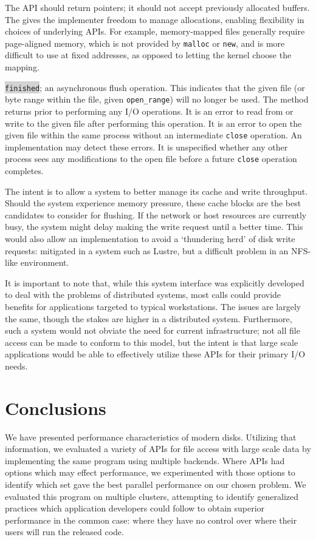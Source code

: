 The API should return pointers; it should not accept previously
allocated buffers.  The gives the implementer freedom to manage
allocations, enabling flexibility in choices of underlying APIs.  For
example, memory-mapped files generally require page-aligned memory,
which is not provided by \verb!malloc! or \verb!new!, and is more
difficult to use at fixed addresses, as opposed to letting the kernel
choose the mapping.

\colorbox{lightgray}{\texttt{finished}}; an asynchronous flush
operation.  This indicates that the given file (or byte range within
the file, given \texttt{open\_range}) will no longer be used.  The
method returns prior to performing any I/O operations.  It is an
error to read from or write to the given file after performing
this operation.  It is an error to open the given file within the
same process without an intermediate \verb!close! operation.  An
implementation may detect these errors.  It is unspecified whether any
other process sees any modifications to the open file before a future
\verb!close! operation completes.

The intent is to allow a system to better manage its cache and write
throughput.  Should the system experience memory pressure, these cache
blocks are the best candidates to consider for flushing.  If the
network or host resources are currently busy, the system might delay
making the write request until a better time.  This would also allow
an implementation to avoid a `thundering herd' of disk write requests:
mitigated in a system such as Lustre, but a difficult problem in an
NFS-like environment.

It is important to note that, while this system interface was
explicitly developed to deal with the problems of distributed systems,
most calls could provide benefits for applications targeted to typical
workstations.  The issues are largely the same, though the stakes are
higher in a distributed system.  Furthermore, such a system would not
obviate the need for current infrastructure; not all file access can
be made to conform to this model, but the intent is that large scale
applications would be able to effectively utilize these APIs for their
primary I/O needs.

\section{Conclusions}\label{sec:conclusions}

We have presented performance characteristics of modern disks.
Utilizing that information, we evaluated a variety of APIs for
file access with large scale data by implementing the same program
using multiple backends.  Where APIs had options which may effect
performance, we experimented with those options to identify which set
gave the best parallel performance on our chosen problem.  We evaluated
this program on multiple clusters, attempting to identify generalized
practices which application developers could follow to obtain superior
performance in the common case: where they have no control over where
their users will run the released code.

